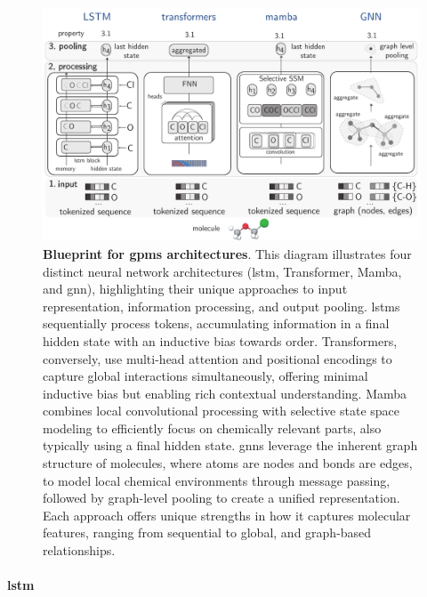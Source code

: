 \begin{figure}[H]
    \centering
    \includegraphics[width=1\textwidth]{figures/rescaled_figures/chemrev_figure6.pdf}
    \caption{\textbf{Blueprint for \glspl{gpm} architectures}. This diagram illustrates four distinct neural network architectures (\gls{lstm}, Transformer, Mamba, and \gls{gnn}), highlighting their unique approaches to input representation, information processing, and output pooling. \glspl{lstm} sequentially process tokens, accumulating information in a final hidden state with an inductive bias towards order. Transformers, conversely, use multi-head attention and positional encodings to capture global interactions simultaneously, offering minimal inductive bias but enabling rich contextual understanding. Mamba combines local convolutional processing with selective state space modeling to efficiently focus on chemically relevant parts, also typically using a final hidden state. \glspl{gnn} leverage the inherent graph structure of molecules, where atoms are nodes and bonds are edges, to model local chemical environments through message passing, followed by graph-level pooling to create a unified representation. Each approach offers unique strengths in how it captures molecular features, ranging from sequential to global, and graph-based relationships.}
    \label{fig:architectures}
\end{figure}


\paragraph{\gls{lstm}}

